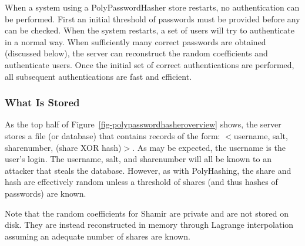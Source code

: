 When a system using a PolyPasswordHasher store restarts, no authentication can
be performed.   First an initial threshold of passwords must be provided
before any can be checked.   When the system restarts, a set of users 
will try to authenticate in a normal way.   
When
sufficiently many correct passwords are obtained (discussed below), the server 
can reconstruct the random coefficients and authenticate users.
Once the initial set of correct authentications are performed, all subsequent
authentications are fast and efficient.

\subsubsection{What Is Stored}

As the top half of Figure~\ref{fig-polypasswordhasheroverview} shows, the server 
stores a file (or database) that contains records of the form:
$<$username, salt, sharenumber, (share XOR hash)$>$.   As may be 
expected, the username is the user's login.   The username, salt, and 
sharenumber
will all be known to an attacker that steals the database.   However,
as with PolyHashing, the share and hash are effectively random 
unless a threshold of shares (and thus hashes of passwords) are
known.

Note that the random coefficients for Shamir are private and are not stored on 
disk.   They are instead reconstructed in memory through Lagrange 
interpolation assuming an adequate number of shares are known.

